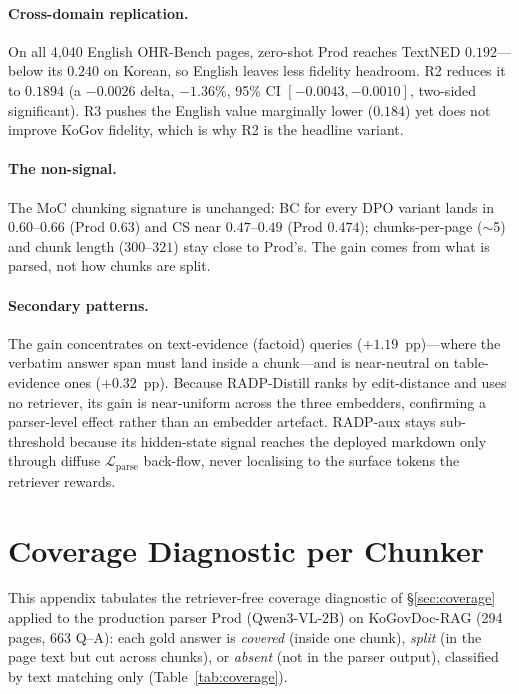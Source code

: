 \documentclass[11pt]{article}
\begin{document}
\paragraph{Cross-domain replication.} On all 4{,}040 English OHR-Bench pages, zero-shot Prod reaches TextNED $0.192$---below its $0.240$ on Korean, so English leaves less fidelity headroom. R2 reduces it to $0.1894$ (a $-0.0026$ delta, $-1.36\%$, 95\% CI $[-0.0043, -0.0010]$, two-sided significant). R3 pushes the English value marginally lower ($0.184$) yet does not improve KoGov fidelity, which is why R2 is the headline variant.

\paragraph{The non-signal.} The MoC chunking signature is unchanged: BC for every DPO variant lands in $0.60$--$0.66$ (Prod $0.63$) and CS near $0.47$--$0.49$ (Prod $0.474$); chunks-per-page ($\sim$5) and chunk length ($300$--$321$) stay close to Prod's. The gain comes from what is parsed, not how chunks are split.

\paragraph{Secondary patterns.} The gain concentrates on text-evidence (factoid) queries ($+1.19$~pp)---where the verbatim answer span must land inside a chunk---and is near-neutral on table-evidence ones ($+0.32$~pp). Because RADP-Distill ranks by edit-distance and uses no retriever, its gain is near-uniform across the three embedders, confirming a parser-level effect rather than an embedder artefact. RADP-aux stays sub-threshold because its hidden-state signal reaches the deployed markdown only through diffuse $\mathcal{L}_\text{parse}$ back-flow, never localising to the surface tokens the retriever rewards.

\section{Coverage Diagnostic per Chunker}
\label{app:coverage}

This appendix tabulates the retriever-free coverage diagnostic of \S\ref{sec:coverage} applied to the production parser Prod (Qwen3-VL-2B) on KoGovDoc-RAG (294 pages, 663 Q--A): each gold answer is \emph{covered} (inside one chunk), \emph{split} (in the page text but cut across chunks), or \emph{absent} (not in the parser output), classified by text matching only (Table~\ref{tab:coverage}).
\end{document}
